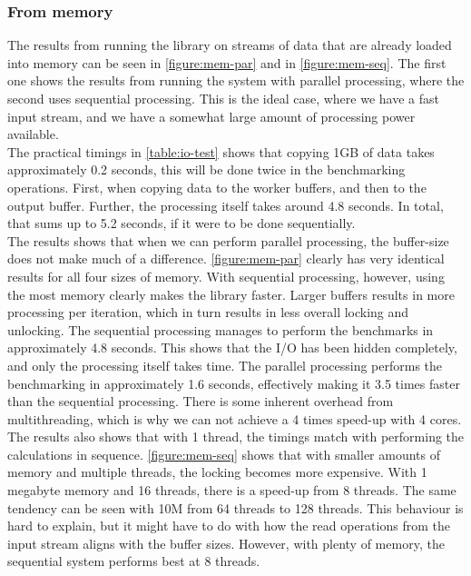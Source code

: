 \documentclass[a4paper]{article}
\begin{document}
\subsubsection{From memory}
The results from running the library on streams of data that are already loaded into memory can be seen in \autoref{figure:mem-par} and in \autoref{figure:mem-seq}. The first one shows the results from running the system with parallel processing, where the second uses sequential processing. This is the ideal case, where we have a fast input stream, and we have a somewhat large amount of processing power available.\\

The practical timings in \autoref{table:io-test} shows that copying 1GB of data takes approximately 0.2 seconds, this will be done twice in the benchmarking operations. First, when copying data to the worker buffers, and then to the output buffer. Further, the processing itself takes around 4.8 seconds. In total, that sums up to 5.2 seconds, if it were to be done sequentially.\\

The results shows that when we can perform parallel processing, the buffer-size does not make much of a difference. \autoref{figure:mem-par} clearly has very identical results for all four sizes of memory. With sequential processing, however, using the most memory clearly makes the library faster. Larger buffers results in more processing per iteration, which in turn results in less overall locking and unlocking. The sequential processing manages to perform the benchmarks in approximately 4.8 seconds. This shows that the I/O has been hidden completely, and only the processing itself takes time. The parallel processing performs the benchmarking in approximately 1.6 seconds, effectively making it 3.5 times faster than the sequential processing. There is some inherent overhead from multithreading, which is why we can not achieve a 4 times speed-up with 4 cores.\\

The results also shows that with 1 thread, the timings match with performing the calculations in sequence. \autoref{figure:mem-seq} shows that with smaller amounts of memory and multiple threads, the locking becomes more expensive. With 1 megabyte memory and 16 threads, there is a speed-up from 8 threads. The same tendency can be seen with 10M from 64 threads to 128 threads. This behaviour is hard to explain, but it might have to do with how the read operations from the input stream aligns with the buffer sizes. However, with plenty of memory, the sequential system performs best at 8 threads. 
\end{document}
